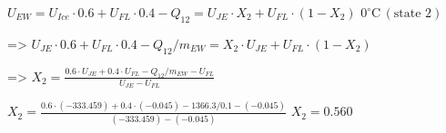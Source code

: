 \( U_{EW} = U_{Ice} \cdot 0.6 + U_{FL} \cdot 0.4 - Q_{12} = U_{JE} \cdot X_2 + U_{FL} \cdot (1 - X_2) \)  
\( 0^\circ \text{C} \, (\text{state 2}) \)  

=> \( U_{JE} \cdot 0.6 + U_{FL} \cdot 0.4 - Q_{12}/m_{EW} = X_2 \cdot U_{JE} + U_{FL} \cdot (1 - X_2) \)  

=> \( X_2 = \frac{0.6 \cdot U_{JE} + 0.4 \cdot U_{FL} - Q_{12}/m_{EW} - U_{FL}}{U_{JE} - U_{FL}} \)  

\( X_2 = \frac{0.6 \cdot (-333.459) + 0.4 \cdot (-0.045) - 1366.3/0.1 - (-0.045)}{(-333.459) - (-0.045)} \)  
\( X_2 = 0.560 \)